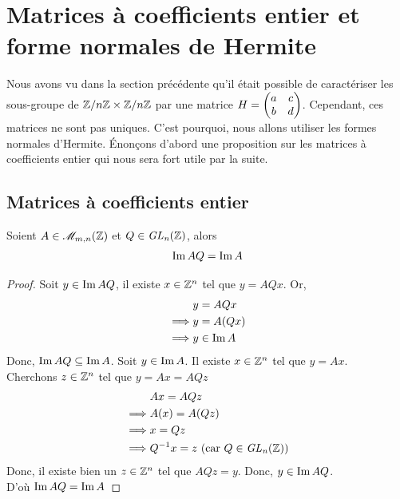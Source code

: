 \documentclass[12pt]{article}
\begin{document}
\newpage
\section{Matrices à coefficients entier et forme normales de Hermite}
Nous avons vu dans la section précédente qu'il était possible de caractériser les sous-groupe de
$\mathbb Z/n\mathbb Z \times \mathbb Z/n\mathbb Z$ par une matrice $H = \begin{pmatrix} a & c\\ b & d \end{pmatrix}$. Cependant, ces matrices ne sont pas uniques. C'est
pourquoi, nous allons utiliser les formes normales d'Hermite.
Énonçons d'abord une proposition sur les matrices à coefficients entier qui nous sera fort
utile par la suite.

\subsection{Matrices à coefficients entier}
\begin{proposition}\label{ima_imaq}
	Soient $A \in \mathscr{M}_{m,n}(\mathbb Z)$ et $Q \in \it {GL}_n(\mathbb Z)$, alors
	$$\operatorname{Im} AQ = \operatorname{Im} A$$
\end{proposition}
\begin{proof}
	Soit $y \in \operatorname{Im} AQ$, il existe $x \in \mathbb Z^n$ tel que $y = AQx$. Or,
	\begin{align*}
		         & y = AQx     \\
		\implies & y = A(Qx)   \\
		\implies & y \in \operatorname{Im} A
	\end{align*}
	Donc, $\operatorname{Im} AQ \subseteq \operatorname{Im} A$.
	Soit $y \in \operatorname{Im} A$. Il existe $x \in \mathbb Z^n$ tel que $y = Ax$.\\
	Cherchons $z \in \mathbb Z^n$ tel que $y = Ax = AQz$
	\begin{align*}
		         & Ax = AQz                                     \\
		\implies & A(x) = A(Qz)                                 \\
		\implies & x = Qz                                       \\
		\implies & Q^{-1} x = z \text{ (car $Q \in \it {GL}_n(\mathbb Z)$)}
	\end{align*}
	Donc, il existe bien un $z \in \mathbb Z^n$ tel que $AQz = y$. Donc, $y \in \operatorname{Im} AQ$.\\
	D'où $\operatorname{Im} AQ = \operatorname{Im} A$

\end{proof}

\newpage
\end{document}
